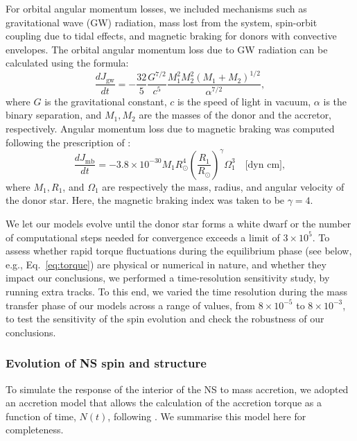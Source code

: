 \documentclass[main.tex]{subfiles}
\begin{document}
        For orbital angular momentum losses, we included mechanisms such as gravitational wave (GW) radiation, mass lost from the system, spin-orbit coupling due to tidal effects, and magnetic braking for donors with convective envelopes.
        The orbital angular momentum loss due to GW radiation can be calculated using the formula: 
        \begin{equation}
            \label{eq:jdot_gw}
            \frac{dJ_{\text{gw}}}{dt} = - \frac{32}{5}\frac{G^{7/2}}{c^5}\frac{M_1^2 M_2^2 (M_1 + M_2)^{1/2}}{\alpha^{7/2}},
        \end{equation}
        where $G$ is the gravitational constant, $c$ is the speed of light in vacuum, $\alpha$ is the binary separation, and $M_1, M_2$ are the masses of the donor and the accretor, respectively.
        Angular momentum loss due to magnetic braking was computed following the prescription of \cite{Rappaport:apj1983}:
        \begin{equation}
            \label{eq:jdot_mb}
            \frac{dJ_{\text{mb}}}{dt} = -3.8 \times 10^{-30} M_1 R_\odot^4 \left(\frac{R_1}{R_\odot}\right)^{\gamma}\Omega_1^3\quad\text{[dyn cm]},
        \end{equation}
        where $M_1, R_1$, and $\Omega_1$ are respectively the mass, radius, and angular velocity of the donor star. Here, the magnetic braking index was taken to be $\gamma = 4$.
        
        We let our models evolve until the donor star forms a white dwarf or the number of computational steps needed for convergence exceeds a limit of $3\times 10^5$.
        To assess whether rapid torque fluctuations during the equilibrium phase (see below, e.g., Eq.~\ref{eq:torque}) are physical or numerical in nature, and whether they impact our conclusions, we performed a time-resolution sensitivity study, by running extra \mesa tracks. To this end, we varied the time resolution during the mass transfer phase of our models across a range of values, from $8\times10^{-5}$ to $8\times10^{-3}$, to test the sensitivity of the spin evolution and check the robustness of our conclusions.
        
    \subsubsection{Evolution of NS spin and structure}
        To simulate the response of the interior of the NS to mass accretion, we adopted
        an accretion model that allows the calculation of the accretion torque as a function of time, $N(t)$, following \cite{Tauris:sc2012}. We summarise this model here for completeness.  
        
\end{document}
